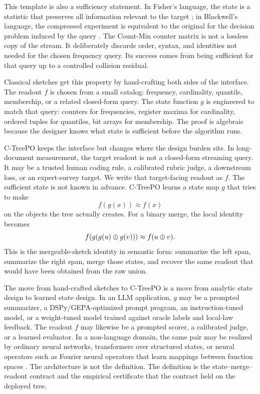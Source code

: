 This template is also a sufficiency statement. In Fisher's language, the state
is a statistic that preserves all information relevant to the target
\citep{Fisher1922}; in Blackwell's language, the compressed experiment is
equivalent to the original for the decision problem induced by the query
\citep{Blackwell1953}. The Count-Min counter matrix is not a lossless copy of
the stream. It deliberately discards order, syntax, and identities not needed
for the chosen frequency query. Its success comes from being sufficient for
that query up to a controlled collision residual.

Classical sketches get this property by hand-crafting both sides of the
interface. The readout $f$ is chosen from a small catalog: frequency,
cardinality, quantile, membership, or a related closed-form query. The state
function $g$ is engineered to match that query: counters for frequencies,
register maxima for cardinality, ordered tuples for quantiles, bit arrays for
membership. The proof is algebraic because the designer knows what state is
sufficient before the algorithm runs.

C-TreePO keeps the interface but changes where the design burden sits. In
long-document measurement, the target readout is not a closed-form streaming
query. It may be a trusted human coding rule, a calibrated rubric judge, a
downstream loss, or an expert-survey target. We write that target-facing
readout as $f$. The sufficient state is not known in advance. C-TreePO learns
a state map $g$ that tries to make
\[
  f(g(x)) \approx f(x)
\]
on the objects the tree actually creates. For a binary merge, the local
identity becomes
\[
  f\!\left(g(g(u)\oplus g(v))\right)
  \approx
  f(u\oplus v).
\]
This is the mergeable-sketch identity in semantic form: summarize the left
span, summarize the right span, merge those states, and recover the same
readout that would have been obtained from the raw union.

The move from hand-crafted sketches to C-TreePO is a move from analytic state
design to learned state design. In an LLM application, $g$ may be a prompted
summarizer, a DSPy/GEPA-optimized prompt program, an instruction-tuned model,
or a weight-tuned model trained against oracle labels and local-law feedback.
The readout $f$ may likewise be a prompted scorer, a calibrated judge, or a
learned evaluator. In a non-language domain, the same pair may be realized by
ordinary neural networks, transformers over structured states, or neural
operators such as Fourier neural operators that learn mappings between
function spaces \citep{Kovachki23NeuralOperator,Li21FNO}. The architecture is
not the definition. The definition is the state--merge--readout contract and
the empirical certificate that the contract held on the deployed tree.

